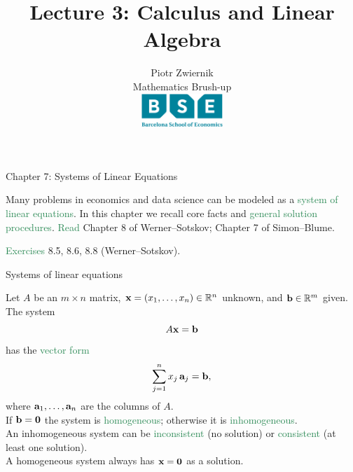 \documentclass[11pt,aspectratio=169]{beamer}
\title[Calculus and Linear Algebra]{Lecture 3: Calculus and Linear Algebra}
\author[Piotr Zwiernik, Barcelona School of Economics]{Piotr Zwiernik \\[4pt]
Mathematics Brush-up\\[8pt]
\includegraphics[width=1.2in]{img/bse.png}}
\date{}
\begin{document}
\begin{frame}
\titlepage
\end{frame}

\begin{frame}{Chapter 7: Systems of Linear Equations}
 
Many problems in economics and data science can be modeled as a \textcolor{SeaGreen}{system of linear equations}.
\vskip 8pt
In this chapter we recall core facts and \textcolor{SeaGreen}{general solution procedures}.
\vskip 8pt
\textcolor{SeaGreen}{Read} Chapter 8 of Werner--Sotskov; Chapter 7 of Simon--Blume. \quad
\bigskip

\textcolor{SeaGreen}{Exercises} 8.5, 8.6, 8.8 (Werner--Sotskov).
 
\end{frame}

\begin{frame}{Systems of linear equations}
 
Let $A$ be an $m\times n$ matrix, ${\bf x}=(x_1,\ldots,x_n)\in\mathbb R^n$ unknown, and ${\bf b}\in\mathbb R^m$ given. The system
\[
A{\bf x}={\bf b}
\]
has the \textcolor{SeaGreen}{vector form}
\[
\sum_{j=1}^n x_j\,{\bf a}_j={\bf b},
\]
where ${\bf a}_1,\dots,{\bf a}_n$ are the columns of $A$.\\[6mm]

If ${\bf b}={\bf 0}$ the system is \textcolor{SeaGreen}{homogeneous}; otherwise it is \textcolor{SeaGreen}{inhomogeneous}.\\[3mm] 
An inhomogeneous system can be \textcolor{SeaGreen}{inconsistent} (no solution) or \textcolor{SeaGreen}{consistent} (at least one solution).\\[3mm]
 A homogeneous system always has ${\bf x}={\bf 0}$ as a solution.
 \end{frame}
\end{document}
